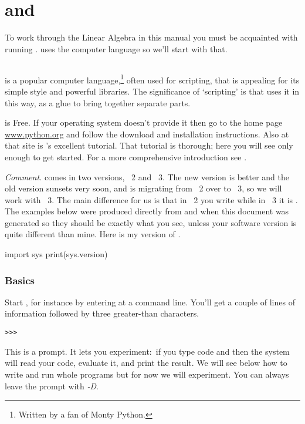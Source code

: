 \chapter{\python{} and \Sage{}}

To work through the Linear Algebra in this manual
you must be acquainted with running \Sage. 
\Sage{} uses the computer language \python{} so we'll start with that.


\section{\python}
\python{} is a popular computer language,\footnote{Written by a fan of
Monty Python.} often used for scripting,
that is appealing for its simple style and powerful libraries.
The significance of `scripting' is that \Sage{} uses it in this way,
as a glue to bring together separate parts.

\python{} is Free.
If your operating system doesn't provide it then go to the home 
page \href{http://www.python.org}{\url{www.python.org}} and follow the
download and installation instructions.
Also at that site is \python's excellent tutorial.
That tutorial is thorough; 
here you will see only enough \python{} to get started.
For a more comprehensive introduction see \cite{PythonTeam12b}.

\smallskip
\textit{Comment.}
\python{} comes in two versions, \python~2 and \python~3.
The new version is better and the old version sunsets very soon, and
\Sage{} is migrating from \python~2 over to \python~3, so we will
work with \python~3. 
The main difference for us is that in \python~2 you write
 while in \python~3 it is . 
The examples below were produced directly 
from \python{} and \Sage{} when this document was generated so they should be 
exactly what you see, 
unless your software version is quite different than mine.
Here is my version of \python. 
\begin{pyconsole}
import sys
print(sys.version)
\end{pyconsole}

\subsection{Basics}
Start \python, for instance by entering 
at a command line.
You'll get a couple of lines of 
information followed by three greater-than
characters.
\begin{lstlisting}[style=python]
>>>   
\end{lstlisting}
This is a prompt.
It lets you experiment:~if you type 
\python{} code and  then the system
will read your code, evaluate it, and print the result.
We will see below how to write and run whole programs
but for now we will experiment.
You can always leave the prompt with \textit{-D}.

